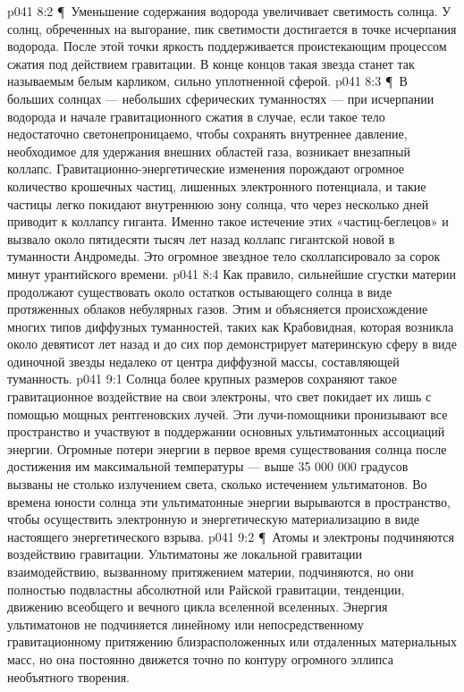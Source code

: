 \vs p041 8:2 \P\ Уменьшение содержания водорода увеличивает светимость солнца. У солнц, обреченных на выгорание, пик светимости достигается в точке исчерпания водорода. После этой точки яркость поддерживается проистекающим процессом сжатия под действием гравитации. В конце концов такая звезда станет так называемым белым карликом, сильно уплотненной сферой.
\vs p041 8:3 \P\ В больших солнцах --- небольших сферических туманностях --- при исчерпании водорода и начале гравитационного сжатия в случае, если такое тело недостаточно светонепроницаемо, чтобы сохранять внутреннее давление, необходимое для удержания внешних областей газа, возникает внезапный коллапс. Гравитационно\hyp{}энергетические изменения порождают огромное количество крошечных частиц, лишенных электронного потенциала, и такие частицы легко покидают внутреннюю зону солнца, что через несколько дней приводит к коллапсу гиганта. Именно такое истечение этих «частиц\hyp{}беглецов» и вызвало около пятидесяти тысяч лет назад коллапс гигантской новой в туманности Андромеды. Это огромное звездное тело сколлапсировало за сорок минут урантийского времени.
\vs p041 8:4 Как правило, сильнейшие сгустки материи продолжают существовать около остатков остывающего солнца в виде протяженных облаков небулярных газов. Этим и объясняется происхождение многих типов диффузных туманностей, таких как Крабовидная, которая возникла около девятисот лет назад и до сих пор демонстрирует материнскую сферу в виде одиночной звезды недалеко от центра диффузной массы, составляющей туманность.
\vs p041 9:1 Солнца более крупных размеров сохраняют такое гравитационное воздействие на свои электроны, что свет покидает их лишь с помощью мощных рентгеновских лучей. Эти лучи\hyp{}помощники пронизывают все пространство и участвуют в поддержании основных ультиматонных ассоциаций энергии. Огромные потери энергии в первое время существования солнца после достижения им максимальной температуры --- выше 35 000 000 градусов вызваны не столько излучением света, сколько истечением ультиматонов. Во времена юности солнца эти ультиматонные энергии вырываются в пространство, чтобы осуществить электронную и энергетическую материализацию в виде настоящего энергетического взрыва.
\vs p041 9:2 \P\ Атомы и электроны подчиняются воздействию гравитации. Ультиматоны же локальной гравитации взаимодействию, вызванному притяжением материи,  подчиняются, но они полностью подвластны абсолютной или Райской гравитации, тенденции, движению всеобщего и вечного цикла вселенной вселенных. Энергия ультиматонов не подчиняется линейному или непосредственному гравитационному притяжению близрасположенных или отдаленных материальных масс, но она постоянно движется точно по контуру огромного эллипса необъятного творения.
